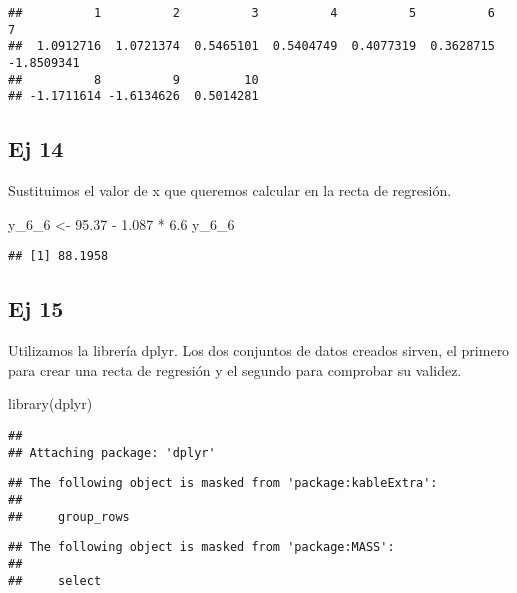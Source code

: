\documentclass[
]{article}
\newenvironment{Shaded}{\begin{snugshade}}{\end{snugshade}}
\newcommand{\FloatTok}[1]{\textcolor[rgb]{0.00,0.00,0.81}{#1}}
\newcommand{\FunctionTok}[1]{\textcolor[rgb]{0.00,0.00,0.00}{#1}}
\newcommand{\NormalTok}[1]{#1}
\newcommand{\OtherTok}[1]{\textcolor[rgb]{0.56,0.35,0.01}{#1}}
\newcommand{\SpecialCharTok}[1]{\textcolor[rgb]{0.00,0.00,0.00}{#1}}
\begin{document}
\begin{verbatim}
##          1          2          3          4          5          6          7 
##  1.0912716  1.0721374  0.5465101  0.5404749  0.4077319  0.3628715 -1.8509341 
##          8          9         10 
## -1.1711614 -1.6134626  0.5014281
\end{verbatim}

\hypertarget{ej-14}{%
\subsection{Ej 14}\label{ej-14}}

Sustituimos el valor de x que queremos calcular en la recta de
regresión.

\begin{Shaded}
\begin{Highlighting}[]
\NormalTok{y\_6\_6 }\OtherTok{\textless{}{-}} \FloatTok{95.37} \SpecialCharTok{{-}} \FloatTok{1.087} \SpecialCharTok{*} \FloatTok{6.6}
\NormalTok{y\_6\_6}
\end{Highlighting}
\end{Shaded}

\begin{verbatim}
## [1] 88.1958
\end{verbatim}

\hypertarget{ej-15}{%
\subsection{Ej 15}\label{ej-15}}

Utilizamos la librería dplyr. Los dos conjuntos de datos creados sirven,
el primero para crear una recta de regresión y el segundo para comprobar
su validez.

\begin{Shaded}
\begin{Highlighting}[]
\FunctionTok{library}\NormalTok{(dplyr)}
\end{Highlighting}
\end{Shaded}

\begin{verbatim}
## 
## Attaching package: 'dplyr'
\end{verbatim}

\begin{verbatim}
## The following object is masked from 'package:kableExtra':
## 
##     group_rows
\end{verbatim}

\begin{verbatim}
## The following object is masked from 'package:MASS':
## 
##     select
\end{verbatim}
\end{document}
